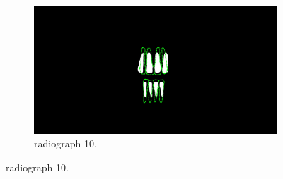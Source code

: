 \documentclass[a4paper,10pt]{article}
\begin{document}
\begin{figure}
\begin{subfigure}[b]{0.45\textwidth}
                \includegraphics[width=\textwidth]{Images/segLand,10.jpg}
                \caption{ radiograph 10.}
                \label{fig:comp3}
        \end{subfigure}
\end{figure}
\end{document}
